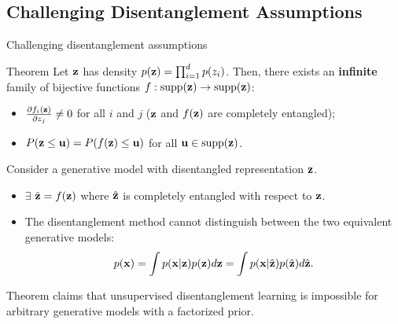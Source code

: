 \subsection{Challenging Disentanglement Assumptions}
\begin{frame}{Challenging disentanglement assumptions}
	
	\begin{block}{Theorem}
		Let $\mathbf{z}$ has density $p(\mathbf{z}) = \prod^d_{i=1} p(z_i)$. Then, there exists an \textbf{infinite} family of bijective functions $f : \text{supp}(\mathbf{z}) \rightarrow \text{supp}(\mathbf{z})$:
		\begin{itemize}
			\item $\frac{\partial f_i(\mathbf{z})}{\partial z_j} \neq 0$ for all $i$ and $j$ ($\mathbf{z}$ and $f(\mathbf{z})$ are completely entangled);
			\item $P(\mathbf{z} \leq \mathbf{u}) = P(f(\mathbf{z}) \leq \mathbf{u})$ for all $\mathbf{u} \in \text{supp}(\mathbf{z})$.
		\end{itemize}  
	\end{block}
	Consider a generative model with disentangled representation $\mathbf{z}$.
	\begin{itemize}
		\item $\exists$ $\hat{\mathbf{z}} = f(\mathbf{z})$ where $\hat{\mathbf{z}}$ is completely entangled
		with respect to $\mathbf{z}$.
		\item The disentanglement method cannot distinguish between the two equivalent generative models:
		\vspace{-0.3cm}
		\[
		p(\mathbf{x}) = \int p(\mathbf{x} | \mathbf{z}) p(\mathbf{z}) d\mathbf{z} = \int p(\mathbf{x} | \hat{\mathbf{z}})p(\hat{\mathbf{z}}) d \hat{\mathbf{z}}.
		\]
		\vspace{-0.6cm}
	\end{itemize}
	Theorem claims that unsupervised disentanglement learning is impossible for arbitrary generative models with a factorized prior.
	
\end{frame}
